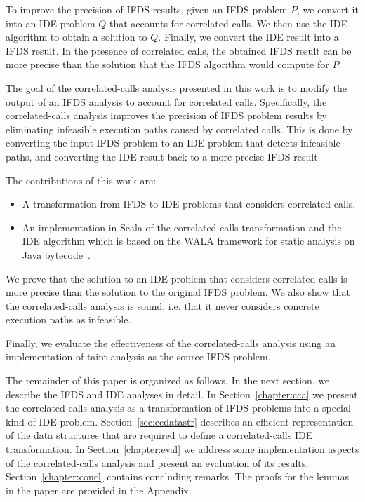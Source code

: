 {{To improve the precision of IFDS results, given an IFDS problem $P$, we convert it into an IDE problem $Q$ that accounts for correlated calls. We then use the IDE algorithm to obtain a solution to $Q$. Finally, we convert the IDE result into a IFDS result. In the presence of correlated calls, the obtained IFDS result can be more precise than the solution that the IFDS algorithm would compute for $P$.

The goal of the correlated-calls analysis presented in this work is to modify the output of an IFDS analysis to account for correlated calls. Specifically, the correlated-calls analysis improves the precision of IFDS problem results by eliminating infeasible execution paths caused by correlated calls. This is done by converting the input-IFDS problem to an IDE problem that detects infeasible paths, and converting the IDE result back to a more precise IFDS result.

The contributions of this work are:
\begin{itemize}
  \item A transformation from IFDS to IDE problems that considers correlated calls.
  \item An implementation in Scala of the correlated-calls transformation and the IDE algorithm which is based on the WALA framework for static analysis on Java bytecode~\cite{fink2012wala}.
\end{itemize}

  We prove that the solution to an IDE problem that considers correlated calls is more precise than the solution to the original IFDS problem.
  We also show that the correlated-calls analysis is sound, i.e. that it never considers concrete execution paths as infeasible.

 Finally, we evaluate the effectiveness of the correlated-calls analysis using an implementation of taint analysis as the source IFDS problem.

The remainder of this paper is organized as follows. In the next section, we describe the IFDS and IDE analyses in detail. In Section~\ref{chapter:cca} we present the correlated-calls analysis as a transformation of IFDS problems into a special kind of IDE problem. Section~\ref{sec:ccdatastr} describes an efficient representation of the data structures that are required to define a correlated-calls IDE transformation.
In Section~\ref{chapter:eval} we address some implementation aspects of the correlated-calls analysis and present an evaluation of its results. Section~\ref{chapter:concl} contains concluding remarks. The proofs for the lemmas in the paper are provided in the Appendix.
}
}
